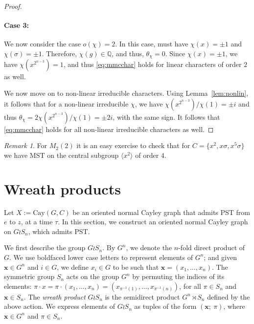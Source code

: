 \documentclass{amsart}
\theoremstyle{plain}
\theoremstyle{remark}\newtheorem{con}[theorem]{Construction}
\theoremstyle{remark} \newtheorem*{remark}{Remark}
\theoremstyle{remark} \newtheorem{example}{Example}
\newcommand{\bb}{\mathbb}
\newcommand{\mrm}{\mathrm}
\newcommand{\mbf}{\mathbf}
\begin{document}
\begin{proof}
\paragraph{Case 3:} We now consider the case $o(\chi) =2$. In this case, must have $\chi(x)=\pm 1$ and $\chi(\sigma)=\pm1$. Therefore, $\chi(g) \in \bb{Q}$, and thus, $\theta_{\chi}=0$. Since $\chi(x)=\pm 1$, we have $\chi(x^{2^{n-3}})=1$, and thus \eqref{eq:mmcchar} holds for linear characters of order $2$ as well.

We now move on to non-linear irreducible characters. Using Lemma~\ref{lem:nonlin}, it follows that for a non-linear irreducible $\chi$, we have $\chi(x^{2^{n-3}})/\chi(1)= \pm i$ and thus $\theta_{\chi}= 2\chi(x^{2^{n-3}})/\chi(1)= \pm 2i$, with the same sign.  It follows that \eqref{eq:mmcchar} holds for all non-linear irreducible characters as well. 
\end{proof}

\begin{remark} For $M_{2}(2)$ it is an easy exercise to check that for $C=\{x^2, x\sigma, x^5\sigma\}$ we have MST on the central subgroup $\langle x^2\rangle$ 
of order $4$.
\end{remark}

\section{Wreath products}\label{sec:wreath}
Let $X:=\mrm{Cay}(G, C)$ be an oriented normal Cayley graph that admits PST from $e$ to $z$, at a time $\tau$. In this section, we construct an oriented normal Cayley graph on $G \wr S_{n}$, which admits PST.

We first describe the group $G\wr S_{n}$. By $G^{n}$, we denote the $n$-fold direct product of $G$. We use boldfaced lower case letters to represent elements of $G^n$; and given $\mbf{x} \in G^{n}$ and $i \in G$, we define $x_{i} \in G$ to be such that $\mbf{x}=(x_{1},\ldots,x_{n})$. The symmetric group $S_{n}$ acts on the group $G^{n}$ by permuting the indices of its elements: $\pi\cdot x =\pi \cdot (x_{1},\ldots, x _{n})= (x_{\pi^{-1}(1)}, \ldots, x_{\pi^{-1}(n)})$, for all $\pi\in S_{n}$ and $\mbf{x}\in S_{n}$. The {\it wreath product} $G\wr S_{n}$ is the semidirect product $G^{n} \rtimes S_{n}$ defined by the above action. We express elements of $G\wr S_{n}$ as tuples of the form $(\mbf{x} ;\ \pi)$, where $\mbf{x} \in G^{n}$ and $\pi \in S_{n}$.
\end{document}
